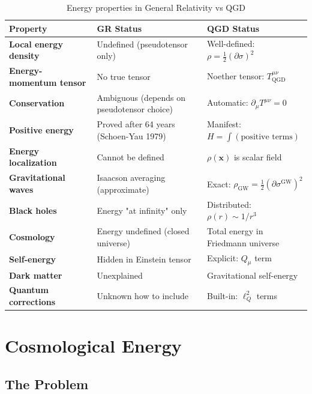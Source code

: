 \documentclass[11pt,a4paper]{article}
\theoremstyle{definition}
\theoremstyle{remark}
\begin{document}
	\begin{table}[h]
		\centering
		\caption{Energy properties in General Relativity vs QGD}
		\begin{tabular}{@{}p{}p{}p{}@{}}
			\toprule
			\textbf{Property} & \textbf{GR Status} & \textbf{QGD Status} \\
			\midrule
			\textbf{Local energy density} & Undefined (pseudotensor only) & Well-defined: $\rho = \frac{1}{2}(\partial\sigma)^2$ \\
			\midrule
			\textbf{Energy-momentum tensor} & No true tensor & Noether tensor: $T^{\mu\nu}_{\text{QGD}}$ \\
			\midrule
			\textbf{Conservation} & Ambiguous (depends on pseudotensor choice) & Automatic: $\partial_\mu T^{\mu\nu} = 0$ \\
			\midrule
			\textbf{Positive energy} & Proved after 64 years (Schoen-Yau 1979) & Manifest: $H = \int (\text{positive terms})$ \\
			\midrule
			\textbf{Energy localization} & Cannot be defined & $\rho(\mathbf{x})$ is scalar field \\
			\midrule
			\textbf{Gravitational waves} & Isaacson averaging (approximate) & Exact: $\rho_{\text{GW}} = \frac{1}{2}(\partial\sigma^{\text{GW}})^2$ \\
			\midrule
			\textbf{Black holes} & Energy "at infinity" only & Distributed: $\rho(r) \sim 1/r^3$ \\
			\midrule
			\textbf{Cosmology} & Energy undefined (closed universe) & Total energy in Friedmann universe \\
			\midrule
			\textbf{Self-energy} & Hidden in Einstein tensor & Explicit: $Q_\mu$ term \\
			\midrule
			\textbf{Dark matter} & Unexplained & Gravitational self-energy \\
			\midrule
			\textbf{Quantum corrections} & Unknown how to include & Built-in: $\ell_Q^2$ terms \\
			\bottomrule
		\end{tabular}
	\end{table}
	
	\section{Cosmological Energy}
	
	\subsection{The Problem}
	
\end{document}
